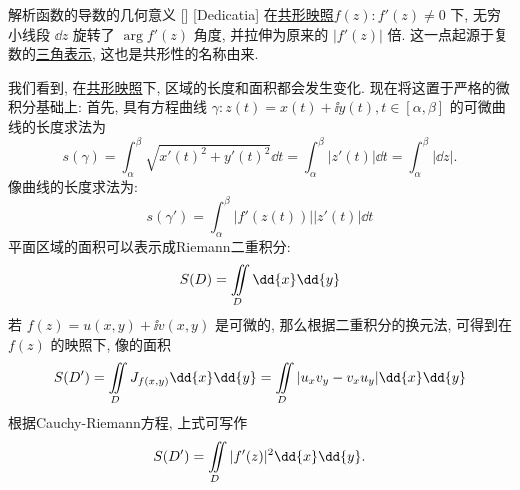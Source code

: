 \documentclass[UTF8]{ctexart}
\newcommand{\AngularForm}{\hyperref[dfn:AngularForm]{三角表示}}
\newcommand{\ConformalMapping}{\hyperref[dfn:ConformalMapping]{共形映照}}
\begin{document}
\begin{crl}
    [UUID]
    {解析函数的导数的几何意义}
    []
    [Dedicatia]
    在\ConformalMapping  \( f(z): f'(z)\neq 0 \) 下, 无穷小线段 \( \dd{z} \) 旋转了 \( \arg f'(z) \) 角度, 并拉伸为原来的 \( |f'(z)| \) 倍. 这一点起源于复数的\AngularForm, 这也是共形性的名称由来. 
\end{crl}
我们看到, 在\ConformalMapping 下, 区域的长度和面积都会发生变化. 现在将这置于严格的微积分基础上: 首先, 具有方程曲线 \( \gamma:z(t)=x(t)+\ii y(t), t\in[\alpha,\beta] \) 的可微曲线的长度求法为
\[s(\gamma)=\int_\alpha^\beta\sqrt{x'(t)^2+y'(t)^2}\dd{t}=\int_{\alpha}^{\beta}|z'(t)|\dd{t}=\int_{\alpha}^\beta|\dd{z}|. \]
像曲线的长度求法为: 
\[s(\gamma')=\int_{\alpha}^{\beta}|f'(z(t))||z'(t)|\dd{t}\]
平面区域的面积可以表示成Riemann二重积分: 
\[S(D)=\iintop_D\dd{x}\dd{y}\]
若 \( f(z)=u(x,y)+\ii v(x,y) \) 是可微的, 那么根据二重积分的换元法, 可得到在 \( f(z) \) 的映照下, 像的面积
\[S(D')=\iintop_{D} J_{f(x,y)}\dd{x}\dd{y}=\iintop_{D}|u_xv_y-v_xu_y|\dd{x}\dd{y}\]
根据Cauchy-Riemann方程, 上式可写作
\[S(D')=\iintop_{D}|f'(z)|^2\dd{x}\dd{y}.\]
\end{document}
